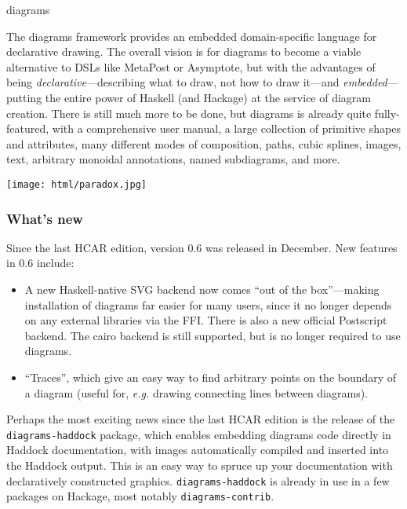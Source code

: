 \begin{hcarentry}[updated]{diagrams}
\makeheader

The diagrams framework provides an embedded domain-specific language
for declarative drawing.  The overall vision is for diagrams to become
a viable alternative to DSLs like MetaPost or Asymptote, but with the
advantages of being \emph{declarative}---describing what to draw, not
how to draw it---and \emph{embedded}---putting the entire power of
Haskell (and Hackage) at the service of diagram creation.  There is
still much more to be done, but diagrams is already quite
fully-featured, with a comprehensive user manual, a large collection
of primitive shapes and attributes, many different modes of
composition, paths, cubic splines, images, text, arbitrary monoidal
annotations, named subdiagrams, and more.

\begin{center}
\texttt{[image: html/paradox.jpg]}
\end{center}

\subsubsection*{What's new}

Since the last HCAR edition, version 0.6 was released in December.
New features in 0.6 include:
\begin{itemize}
\item A new Haskell-native SVG backend now comes ``out of the
  box''---making installation of diagrams far easier for many users,
  since it no longer depends on any external libraries via the
  FFI. There is also a new official Postscript backend.  The cairo
  backend is still supported, but is no longer required to use
  diagrams.
\item ``Traces'', which give an easy way to find arbitrary points on
  the boundary of a diagram (useful for, \emph{e.g.} drawing
  connecting lines between diagrams).
\end{itemize}

Perhaps the most exciting news since the last HCAR edition is the
release of the \texttt{diagrams-haddock} package, which enables
embedding diagrams code directly in Haddock documentation, with images
automatically compiled and inserted into the Haddock output.  This is
an easy way to spruce up your documentation with declaratively
constructed graphics.  \texttt{diagrams-haddock} is already in use
in a few packages on Hackage, most notably \texttt{diagrams-contrib}.


\end{hcarentry}
